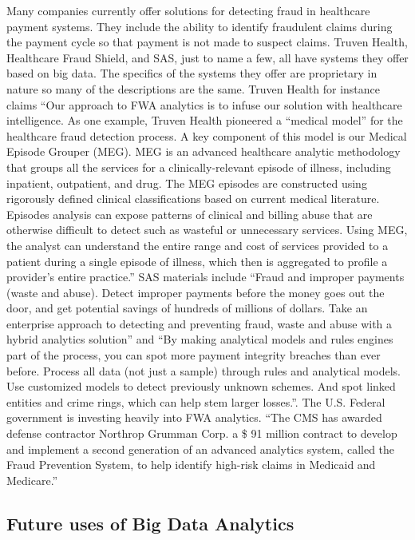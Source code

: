 \documentclass[sigconf]{acmart}
\begin{document}
Many companies currently offer solutions for detecting fraud in healthcare payment systems. 
They include the ability to identify fraudulent claims during the payment cycle so that payment 
is not made to suspect claims.  Truven Health\cite{TruvenHealth}, Healthcare Fraud Shield\cite{FraudShield}, 
and SAS\cite{SASHealth}, just to name a few, all have systems they offer based on big data.  The 
specifics of the systems they offer are proprietary in nature so many of the descriptions are 
the same.  Truven Health for instance claims ``Our approach to FWA analytics is to infuse our 
solution with healthcare intelligence.  As one example, Truven Health pioneered a ``medical model'' 
for the healthcare fraud detection process.  A key component of this model is our Medical Episode 
Grouper (MEG).  MEG is an advanced healthcare analytic methodology that groups all the services 
for a clinically-relevant episode of illness, including inpatient, outpatient, and drug.  The MEG 
episodes are constructed using rigorously defined clinical classifications based on current medical 
literature.  Episodes analysis can expose patterns of clinical and billing abuse that are otherwise 
difficult to detect such as wasteful or unnecessary services.  Using MEG, the analyst can understand 
the entire range and cost of services provided to a patient during a single episode of illness, 
which then is aggregated to profile a provider’s entire practice.''\cite{TruvenHealth} SAS materials 
include ``Fraud and improper payments (waste and abuse). Detect improper payments before the money 
goes out the door, and get potential savings of hundreds of millions of dollars. Take an enterprise 
approach to detecting and preventing fraud, waste and abuse with a hybrid analytics 
solution''\cite{SASHealth} and ``By making analytical models and rules engines part of the process, you 
can spot more payment integrity breaches than ever before. Process all data (not just a sample) 
through rules and analytical models. Use customized models to detect previously unknown schemes. 
And spot linked entities and crime rings, which can help stem larger losses.''\cite{SASFraud}.  The U.S. 
Federal government is investing heavily into FWA analytics.  ``The CMS has awarded defense 
contractor Northrop Grumman Corp. a \$ 91 million contract to develop and implement a second 
generation of an advanced analytics system, called the Fraud Prevention System, to help identify 
high-risk claims in Medicaid and Medicare.''\cite{ModernHealthcare}

\subsection{Future uses of Big Data Analytics}
\end{document}
